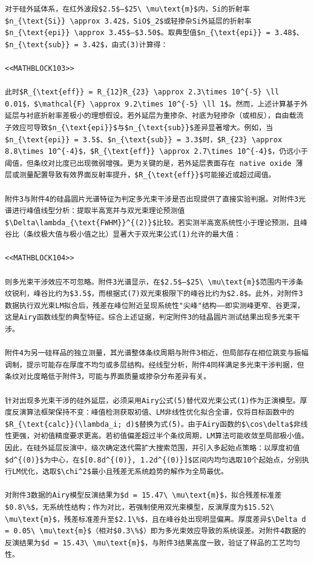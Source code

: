 \documentclass{mcmthesis}
\begin{document}
\begin{table}[htbp]
\begin{lstlisting}
对于硅外延体系，在红外波段$2.5$–$25\ \mu\text{m}$内，Si的折射率$n_{\text{Si}} \approx 3.42$，SiO$_2$或轻掺杂Si外延层的折射率$n_{\text{epi}} \approx 3.45$–$3.50$。取典型值$n_{\text{epi}} = 3.48$、$n_{\text{sub}} = 3.42$，由式(3)计算得：

<<MATHBLOCK103>>

此时$R_{\text{eff}} = R_{12}R_{23} \approx 2.3\times 10^{-5} \ll 0.01$，$\mathcal{F} \approx 9.2\times 10^{-5} \ll 1$。然而，上述计算基于外延层与衬底折射率差极小的理想假设。若外延层为重掺杂、衬底为轻掺杂（或相反），自由载流子效应可导致$n_{\text{epi}}$与$n_{\text{sub}}$差异显著增大。例如，当$n_{\text{epi}} = 3.5$、$n_{\text{sub}} = 3.3$时，$R_{23} \approx 8.8\times 10^{-4}$，$R_{\text{eff}} \approx 2.7\times 10^{-4}$，仍远小于阈值，但条纹对比度已出现微弱增强。更为关键的是，若外延层表面存在 native oxide 薄层或测量配置导致有效界面反射率提升，$R_{\text{eff}}$可能接近或超过阈值。

附件3与附件4的硅晶圆片光谱特征为判定多光束干涉是否出现提供了直接实验判据。对附件3光谱进行峰值线型分析：提取半高宽并与双光束理论预测值$\Delta\lambda_{\text{FWHM}}^{(2)}$比较。若实测半高宽系统性小于理论预测，且峰谷比（条纹极大值与极小值之比）显著大于双光束公式(1)允许的最大值：

<<MATHBLOCK104>>

则多光束干涉效应不可忽略。附件3光谱显示，在$2.5$–$25\ \mu\text{m}$范围内干涉条纹锐利，峰谷比约为$3.5$，而根据式(7)双光束极限下的峰谷比约为$2.8$。此外，对附件3数据执行双光束LM拟合后，残差在峰位附近呈现系统性"尖峰"结构——即实测峰更窄、谷更深，这是Airy函数线型的典型特征。综合上述证据，判定附件3的硅晶圆片测试结果出现多光束干涉。

附件4为另一硅样品的独立测量，其光谱整体条纹周期与附件3相近，但局部存在相位跳变与振幅调制，提示可能存在厚度不均匀或多层结构。经线型分析，附件4同样满足多光束干涉判据，但条纹对比度略低于附件3，可能与界面质量或掺杂分布差异有关。

针对出现多光束干涉的硅外延层，必须采用Airy公式(5)替代双光束公式(1)作为正演模型。厚度反演算法框架保持不变：峰值检测获取初值、LM非线性优化拟合全谱，仅将目标函数中的$R_{\text{calc}}(\lambda_i; d)$替换为式(5)。由于Airy函数的$\cos\delta$非线性更强，对初值精度要求更高。若初值偏差超过半个条纹周期，LM算法可能收敛至局部极小值。因此，在硅外延层反演中，级次确定迭代需扩大搜索范围，并引入多起始点策略：以厚度初值$d^{(0)}$为中心，在$[0.8d^{(0)}, 1.2d^{(0)}]$区间内均匀选取10个起始点，分别执行LM优化，选取$\chi^2$最小且残差无系统趋势的解作为全局最优。

对附件3数据的Airy模型反演结果为$d = 15.47\ \mu\text{m}$，拟合残差标准差$0.8\%$，无系统性结构；作为对比，若强制使用双光束模型，反演厚度为$15.52\ \mu\text{m}$，残差标准差升至$2.1\%$，且在峰谷处出现明显偏离。厚度差异$\Delta d = 0.05\ \mu\text{m}$（相对$0.3\%$）即为多光束效应导致的系统误差。对附件4数据的反演结果为$d = 15.43\ \mu\text{m}$，与附件3结果高度一致，验证了样品的工艺均匀性。


\end{lstlisting}
\end{table}
\end{document}
